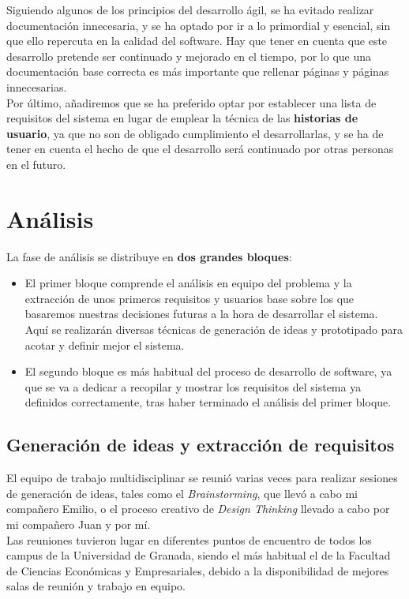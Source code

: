 Siguiendo algunos de los principios del desarrollo ágil, se ha evitado realizar documentación innecesaria, y se ha optado por ir a lo primordial y esencial, sin que ello repercuta en la calidad del software. Hay que tener en cuenta que este desarrollo pretende ser continuado y mejorado en el tiempo, por lo que una documentación base correcta es más importante que rellenar páginas y páginas innecesarias.\\

Por último, añadiremos que se ha preferido optar por establecer una lista de requisitos del sistema en lugar de emplear la técnica de las \textbf{historias de usuario}, ya que no son de obligado cumplimiento el desarrollarlas, y se ha de tener en cuenta el hecho de que el desarrollo será continuado por otras personas en el futuro.

\section{Análisis}
La fase de análisis se distribuye en \textbf{dos grandes bloques}:

\begin{itemize}
    \item El primer bloque comprende el análisis en equipo del problema y la extracción de unos primeros requisitos y usuarios base sobre los que basaremos nuestras decisiones futuras a la hora de desarrollar el sistema. Aquí se realizarán diversas técnicas de generación de ideas y prototipado para acotar y definir mejor el sistema.
    \item El segundo bloque es más habitual del proceso de desarrollo de software, ya que se va a dedicar a recopilar y mostrar los requisitos del sistema ya definidos correctamente, tras haber terminado el análisis del primer bloque.
\end{itemize}

\subsection{Generación de ideas y extracción de requisitos}
El equipo de trabajo multidisciplinar se reunió varias veces para realizar sesiones de generación de ideas, tales como el \textit{Brainstorming}, que llevó a cabo mi compañero Emilio, o el proceso creativo de \textit{Design Thinking} llevado a cabo por mi compañero Juan y por mí.\\

Las reuniones tuvieron lugar en diferentes puntos de encuentro de todos los campus de la Universidad de Granada, siendo el más habitual el de la Facultad de Ciencias Económicas y Empresariales, debido a la disponibilidad de mejores salas de reunión y trabajo en equipo.\\


